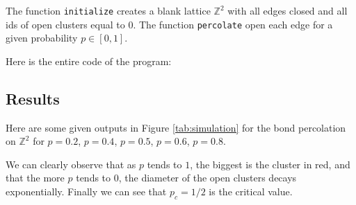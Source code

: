 \documentclass[a4paper,11pt]{article}
\theoremstyle{plain}
\theoremstyle{definition}
\theoremstyle{remark}
\begin{document}
The function \lstinline[language=Python]{initialize} creates a blank lattice $\mathbb{Z}^2$ with all edges closed and all ids of open clusters equal to $0$. The function \lstinline[language=Python]{percolate} open each edge for a given probability $p \in [0,1]$.

Here is the entire code of the program:


\subsection{Results}
Here are some given outputs in Figure \ref{tab:simulation} for the bond percolation on $\mathbb{Z}^2$ for $p = 0.2$, $p = 0.4$, $p = 0.5$, $p = 0.6$, $p = 0.8$.

We can clearly observe that as $p$ tends to $1$, the biggest is the cluster in red, and that the more $p$ tends to $0$, the diameter of the open clusters decays exponentially. Finally we can see that $p_c = 1/2$ is the critical value.
\end{document}
